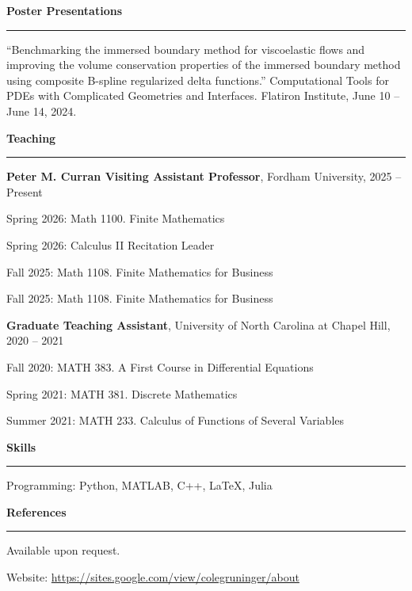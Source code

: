 \documentclass[10pt]{article}
\newcommand{\cvsection}[1]{%
  \vspace{0.8em}%
  {\large\bfseries #1\par}%
  \vspace{0.25em}%
  \hrule
  \vspace{0.3em}%
}
\begin{document}
\cvsection{Poster Presentations}

``Benchmarking the immersed boundary method for viscoelastic flows and improving the volume conservation properties of the immersed boundary method using composite B-spline regularized delta functions.'' Computational Tools for PDEs with Complicated Geometries and Interfaces. Flatiron Institute, June 10 -- June 14, 2024.

\cvsection{Teaching}

\textbf{Peter M. Curran Visiting Assistant Professor}, Fordham University, 2025 -- Present \par 
Spring 2026: Math 1100. Finite Mathematics\par
Spring 2026: Calculus II Recitation Leader\par
Fall 2025: Math 1108. Finite Mathematics for Business\par
Fall 2025: Math 1108. Finite Mathematics for Business\par

\textbf{Graduate Teaching Assistant}, University of North Carolina at Chapel Hill, 2020 -- 2021\par
Fall 2020: MATH 383. A First Course in Differential Equations\par
Spring 2021: MATH 381. Discrete Mathematics\par
Summer 2021: MATH 233. Calculus of Functions of Several Variables
\newpage
\cvsection{Skills}

Programming: Python, MATLAB, C++, LaTeX, Julia

\cvsection{References}

Available upon request.\par
Website: \href{https://sites.google.com/view/colegruninger/about}{https://sites.google.com/view/colegruninger/about}
\end{document}
